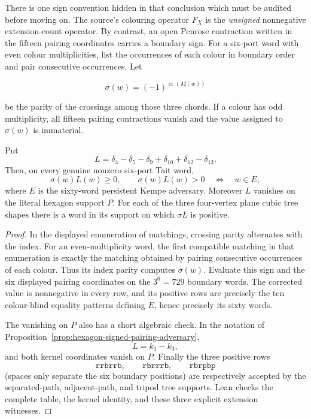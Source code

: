 There is one sign convention hidden in that conclusion which must be audited
before moving on.  The source's colouring operator $F_X$ is the
\emph{unsigned} nonnegative extension-count operator.  By contrast, an open
Penrose contraction written in the fifteen pairing coordinates carries a
boundary sign.  For a six-port word with even colour multiplicities, list the
occurrences of each colour in boundary order and pair consecutive
occurrences.  Let

\[
             \sigma(w)=(-1)^{\operatorname{cr}(M(w))}
\]

be the parity of the crossings among those three chords.  If a colour has
odd multiplicity, all fifteen pairing contractions vanish and the value
assigned to $\sigma(w)$ is immaterial.

\begin{proposition}
\label{prop:hexagon-penrose-gauge-adversary}
Put
\[
 L=\delta_4-\delta_5-\delta_9+\delta_{10}
       +\delta_{12}-\delta_{13}.
\]
Then, on every genuine nonzero six-port Tait word,
\[
 \sigma(w)L(w)\geq0,
 \qquad
 \sigma(w)L(w)>0\quad\Longleftrightarrow\quad w\in E,
\]
where $E$ is the sixty-word persistent Kempe adversary.  Moreover $L$
vanishes on the literal hexagon support $P$.  For each of the three
four-vertex plane cubic tree shapes there is a word in its support on which
$\sigma L$ is positive.
\end{proposition}

\begin{proof}
In the displayed enumeration of matchings, crossing parity alternates with
the index.  For an even-multiplicity word, the first compatible matching in
that enumeration is exactly the matching obtained by pairing consecutive
occurrences of each colour.  Thus its index parity computes $\sigma(w)$.
Evaluate this sign and the six displayed pairing coordinates on the
$3^6=729$ boundary words.  The corrected value is nonnegative in every
row, and its positive rows are precisely the ten colour-blind equality
patterns defining $E$, hence precisely its sixty words.

The vanishing on $P$ also has a short algebraic check.  In the notation of
Proposition~\ref{prop:hexagon-signed-pairing-adversary},
\[
                         L=k_1-k_3,
\]
and both kernel coordinates vanish on $P$.  Finally the three positive
rows
\[
 \mathtt{rrbrrb},\qquad \mathtt{rbrrrb},\qquad \mathtt{rbrpbp}
\]
(spaces only separate the six boundary positions) are respectively accepted
by the separated-path, adjacent-path, and tripod tree supports.  Lean checks
the complete table, the kernel identity, and these three explicit extension
witnesses.
\end{proof}

